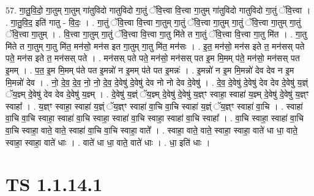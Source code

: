 \documentclass[17pt]{extarticle}
\begin{document}
57. गा॒तु॒वि॒दो॒ गा॒तुम् गा॒तुम् गा॑तुविदो गातुविदो गा॒तुं ॅवि॒त्त्वा वि॒त्त्वा गा॒तुम् गा॑तुविदो गातुविदो गा॒तुं ॅवि॒त्त्वा । . गा॒तु॒वि॒द॒ इति॑ गातु - वि॒दः॒ । . गा॒तुं ॅवि॒त्त्वा वि॒त्त्वा गा॒तुम् गा॒तुं ॅवि॒त्त्वा गा॒तुम् गा॒तुं ॅवि॒त्त्वा गा॒तुम् गा॒तुं ॅवि॒त्त्वा गा॒तुम् । . वि॒त्त्वा गा॒तुम् गा॒तुं ॅवि॒त्त्वा वि॒त्त्वा गा॒तु मि॑ते त गा॒तुं ॅवि॒त्त्वा वि॒त्त्वा गा॒तु मि॑त । . गा॒तु मि॑ते त गा॒तुम् गा॒तु मि॑त॒ मन॑सो॒ मन॑स इत गा॒तुम् गा॒तु मि॑त॒ मन॑सः । . इ॒त॒ मन॑सो॒ मन॑स इते त॒ मन॑सस् पते पते॒ मन॑स इते त॒ मन॑सस् पते । . मन॑सस् पते पते॒ मन॑सो॒ मन॑सस् पत इ॒म मि॒मम् प॑ते॒ मन॑सो॒ मन॑सस् पत इ॒मम् । . प॒त॒ इ॒म मि॒मम् प॑ते पत इ॒मन्नो॑ न इ॒मम् प॑ते पत इ॒मन्नः॑ । . इ॒मन्नो॑ न इ॒म मि॒मन्नो॑ देव देव न इ॒म मि॒मन्नो॑ देव । . नो॒ दे॒व॒ दे॒व॒ नो॒ नो॒ दे॒व॒ दे॒वेषु॑ दे॒वेषु॑ देव नो नो देव दे॒वेषु॑ । . दे॒व॒ दे॒वेषु॑ दे॒वेषु॑ देव देव दे॒वेषु॑ य॒ज्ञ्ं ॅय॒ज्ञ्म् दे॒वेषु॑ देव देव दे॒वेषु॑ य॒ज्ञ्म् । . दे॒वेषु॑ य॒ज्ञ्ं ॅय॒ज्ञ्म् दे॒वेषु॑ दे॒वेषु॑ य॒ज्ञ्ꣳ स्वाहा॒ स्वाहा॑ य॒ज्ञ्म् दे॒वेषु॑ दे॒वेषु॑ य॒ज्ञ्ꣳ स्वाहा᳚ । . य॒ज्ञ्ꣳ स्वाहा॒ स्वाहा॑ य॒ज्ञ्ं ॅय॒ज्ञ्ꣳ स्वाहा॑ वा॒चि वा॒चि स्वाहा॑ य॒ज्ञ्ं ॅय॒ज्ञ्ꣳ स्वाहा॑ वा॒चि । . स्वाहा॑ वा॒चि वा॒चि स्वाहा॒ स्वाहा॑ वा॒चि स्वाहा॒ स्वाहा॑ वा॒चि स्वाहा॒ स्वाहा॑ वा॒चि स्वाहा᳚ । . वा॒चि स्वाहा॒ स्वाहा॑ वा॒चि वा॒चि स्वाहा॒ वाते॒ वाते॒ स्वाहा॑ वा॒चि वा॒चि स्वाहा॒ वाते᳚ । . स्वाहा॒ वाते॒ वाते॒ स्वाहा॒ स्वाहा॒ वाते॑ धा धा॒ वाते॒ स्वाहा॒ स्वाहा॒ वाते॑ धाः । . वाते॑ धा धा॒ वाते॒ वाते॑ धाः । . धा॒ इति॑ धाः । \newline
\pagebreak
{}

\section{ TS 1.1.14.1 }
\end{document}
